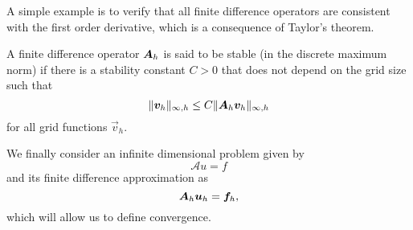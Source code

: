 A simple example is to verify that all finite difference operators are consistent with the first order derivative, which is a consequence of Taylor's theorem.
\begin{definition}[Stability]
    A finite difference operator $\mat A_h$ is said to be stable (in the discrete maximum norm) if there is a stability constant $C>0$ that does not depend on the grid size such that
    \begin{equation}\label{def:stability}
        \| \vec v_h \|_{\infty,h} \leq C \|\mat A_h \vec v_h \|_{\infty,h}
    \end{equation}
    for all grid functions $\vec v_h$. 
\end{definition}
We finally consider an infinite dimensional problem given by
\begin{equation}
    \mathcal A u = f
\end{equation}
and its finite difference approximation as
\begin{equation}\label{def:fd-approx}
    \mat A_h \vec u_h = \vec f_h,
\end{equation}
which will allow us to define convergence. 

